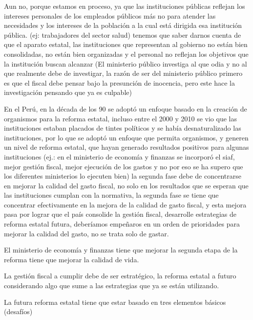 \documentclass[
  letterpaper,
  DIV=11,
  numbers=noendperiod]{scrartcl}
\begin{document}
Aun no, porque estamos en proceso, ya que las instituciones públicas
reflejan los intereses personales de los empleados públicos más no para
atender las necesidades y los intereses de la población a la cual está
dirigida esa institución pública. (ej: trabajadores del sector salud)
tenemos que saber darnos cuenta de que el aparato estatal, las
instituciones que representan al gobierno no están bien consolidadas, no
están bien organizadas y el personal no reflejan los objetivos que la
institución buscan alcanzar (El ministerio público investiga al que odia
y no al que realmente debe de investigar, la razón de ser del ministerio
público primero es que el fiscal debe pensar bajo la presunción de
inocencia, pero este hace la investigación pensando que ya es culpable)

En el Perú, en la década de los 90 se adoptó un enfoque basado en la
creación de organismos para la reforma estatal, incluso entre el 2000 y
2010 se vio que las instituciones estaban placados de tintes políticos y
se había desnaturalizado las instituciones, por lo que se adoptó un
enfoque que permita organismos, y generen un nivel de reforma estatal,
que hayan generado resultados positivos para algunas instituciones (ej.:
en el ministerio de economía y finanzas se incorporó el siaf, mejor
gestión fiscal, mejor ejecución de los gastos y no por eso se ha supero
que los diferentes ministerios lo ejecuten bien) la segunda fase debe de
concentrarse en mejorar la calidad del gasto fiscal, no solo en los
resultados que se esperan que las instituciones cumplan con la
normativa, la segunda fase se tiene que concentrar efectivamente en la
mejora de la calidad de gasto fiscal, y esta mejora pasa por lograr que
el país consolide la gestión fiscal, desarrolle estrategias de reforma
estatal futura, deberíamos empeñaros en un orden de prioridades para
mejorar la calidad del gasto, no se trata solo de gastar.

El ministerio de economía y finanzas tiene que mejorar la segunda etapa
de la reforma tiene que mejorar la calidad de vida.

La gestión fiscal a cumplir debe de ser estratégico, la reforma estatal
a futuro considerando algo que sume a las estrategias que ya se están
utilizando.

La futura reforma estatal tiene que estar basado en tres elementos
básicos (desafíos)
\end{document}
